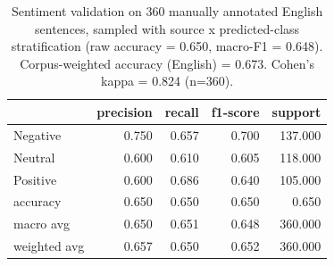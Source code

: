 \begin{table}
\caption{Sentiment validation on 360 manually annotated English sentences, sampled with source x predicted-class stratification (raw accuracy = 0.650, macro-F1 = 0.648). Corpus-weighted accuracy (English) = 0.673. Cohen's kappa = 0.824 (n=360).}
\label{tab:sentiment_validation}
\begin{tabular}{lrrrr}
\toprule
 & precision & recall & f1-score & support \\
\midrule
Negative & 0.750 & 0.657 & 0.700 & 137.000 \\
Neutral & 0.600 & 0.610 & 0.605 & 118.000 \\
Positive & 0.600 & 0.686 & 0.640 & 105.000 \\
accuracy & 0.650 & 0.650 & 0.650 & 0.650 \\
macro avg & 0.650 & 0.651 & 0.648 & 360.000 \\
weighted avg & 0.657 & 0.650 & 0.652 & 360.000 \\
\bottomrule
\end{tabular}
\end{table}
